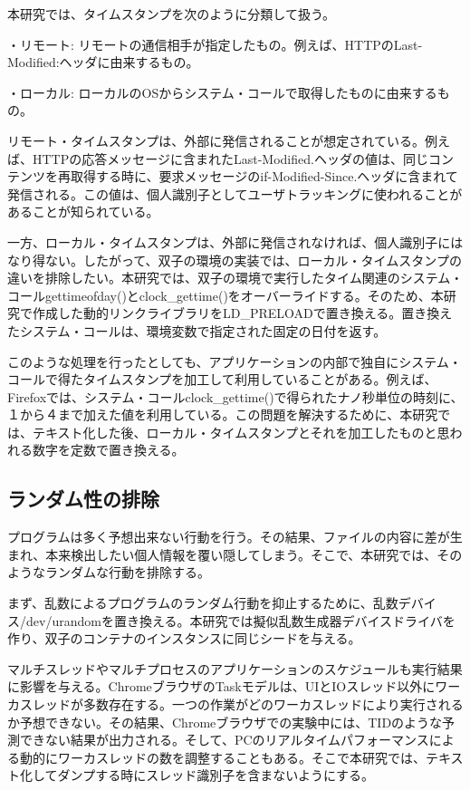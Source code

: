 \documentclass[a4paper,twocolumn,10pt]{jarticle}
\begin{document}
本研究では、タイムスタンプを次のように分類して扱う。
\begin{description}
\item{・リモート: }
リモートの通信相手が指定したもの。例えば、HTTPのLast-Modified:ヘッダに由来するもの。
\item{・ローカル: }
ローカルのOSからシステム・コールで取得したものに由来するもの。
\end{description}
リモート・タイムスタンプは、外部に発信されることが想定されている。例えば、HTTPの応答メッセージに含まれたLast-Modified.ヘッダの値は、同じコンテンツを再取得する時に、要求メッセージのif-Modified-Since.ヘッダに含まれて発信される。この値は、個人識別子としてユーザトラッキングに使われることがあることが知られている。

一方、ローカル・タイムスタンプは、外部に発信されなければ、個人識別子にはなり得ない。したがって、双子の環境の実装では、ローカル・タイムスタンプの違いを排除したい。本研究では、双子の環境で実行したタイム関連のシステム・コールgettimeofday()とclock\_gettime()をオーバーライドする。そのため、本研究で作成した動的リンクライブラリをLD\_PRELOADで置き換える。置き換えたシステム・コールは、環境変数で指定された固定の日付を返す。


このような処理を行ったとしても、アプリケーションの内部で独自にシステム・コールで得たタイムスタンプを加工して利用していることがある。例えば、Firefoxでは、システム・コールclock\_gettime()で得られたナノ秒単位の時刻に、１から４まで加えた値を利用している。この問題を解決するために、本研究では、テキスト化した後、ローカル・タイムスタンプとそれを加工したものと思われる数字を定数で置き換える。

\subsection{ランダム性の排除}

プログラムは多く予想出来ない行動を行う。その結果、ファイルの内容に差が生まれ、本来検出したい個人情報を覆い隠してしまう。そこで、本研究では、そのようなランダムな行動を排除する。

まず、乱数によるプログラムのランダム行動を抑止するために、乱数デバイス/dev/urandomを置き換える。本研究では擬似乱数生成器デバイスドライバを作り、双子のコンテナのインスタンスに同じシードを与える。

マルチスレッドやマルチプロセスのアプリケーションのスケジュールも実行結果に影響を与える。ChromeブラウザのTaskモデルは、UIとIOスレッド以外にワーカスレッドが多数存在する。一つの作業がどのワーカスレッドにより実行されるか予想できない。その結果、Chromeブラウザでの実験中には、TIDのような予測できない結果が出力される。そして、PCのリアルタイムパフォーマンスによる動的にワーカスレッドの数を調整することもある。そこで本研究では、テキスト化してダンプする時にスレッド識別子を含まないようにする。
\end{document}
